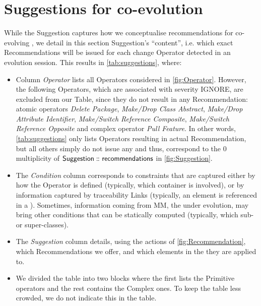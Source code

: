 \section{Suggestions for \viewtype co-evolution} 
\label{sec:Approach}

While the \textsf{Suggestion} \metamodel captures how we
conceptualise recommendations for co-evolving \viewtypes, we detail
in this section \textsf{Suggestion}'s ``content'', i.e. which exact \textsf{Recommendation}s
will be issued for each change \textsf{Operator} detected in an evolution
session. This results in \cref{tab:suggestions}, where:
\begin{itemize}
	\item Column \textsl{Operator} lists all \textsf{Operator}s considered in \cref{fig:Operator}. 
    However, the following \textsf{Operator}s, which are
	associated with severity \textsf{IGNORE}, are excluded from our Table, since 
	they do not result in any \textsf{Recommendation}: atomic operators \textit{Delete Package}, 
	\textit{Make/Drop Class Abstract}, \textit{Make/Drop Attribute Identifier}, 
	\textit{Make/Switch Reference Composite}, \textit{Make/Switch Reference Opposite}
	and complex operator \textit{Pull Feature}. In other words, \cref{tab:suggestions} only
	lists \textsf{Operator}s resulting in actual \textsf{Recommendation}, but all
	others simply do not issue any and thus, correspond to the \textsf{0} multiplicity
	of $\mathsf{Suggestion} \,\colon\!\!\!\colon \mathsf{recommendations}$ in \cref{fig:Suggestion}.
	
	\item The \textsl{Condition} column corresponds to constraints that are captured
	either by how the \textsf{Operator} is defined (typically, which \textsf{container}
	is involved), or by information captured by traceability \textsf{Link}s (typically,
	an element is referenced in a \viewtype). Sometimes, information coming from \textsf{MM},
	the \metamodel under evolution, may bring other conditions that can be statically
	computed (typically, which sub- or super-classes). 
	
	\item The \textsl{Suggestion} column details, using the actions of \cref{fig:Recommendation}, which \textsf{Recommendation}s we offer, and which elements in the \viewtype they are applied to.

    \item We divided the table into two blocks where the first lists the \textsf{Primitive} operators and the rest contains the \textsf{Complex} ones.
		To keep the table less crowded, we do not indicate this in the table.
\end{itemize}

